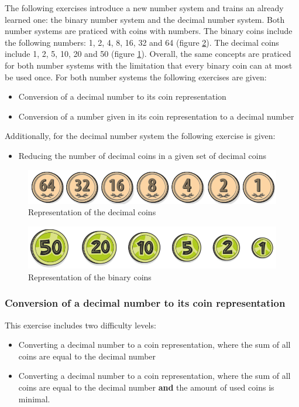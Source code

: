 The following exercises introduce a new number system and trains an already learned one: the binary number system and the decimal number system. Both number systems are praticed with coins with numbers. The binary coins include the following numbers: 1, 2, 4, 8, 16, 32 and 64 (figure \ref{fig:binary_coins}). The decimal coins include 1, 2, 5, 10, 20 and 50 (figure \ref{fig:decimal_coins}). 
Overall, the same concepts are praticed for both number systems with the limitation that every binary coin can at most be used once. For both number systems the following exercises are given:
\begin{itemize}
    \item Conversion of a decimal number to its coin representation
    \item Conversion of a number given in its coin representation to a decimal number
\end{itemize}
Additionally, for the decimal number system the following exercise is given:
\begin{itemize}
    \item Reducing the number of decimal coins in a given set of decimal coins
\end{itemize}

\begin{figure} 
    \centering
    \includegraphics[width=0.5 \columnwidth]{figures/decimal_coins.png}
    \caption{Representation of the decimal coins} 
    \label{fig:decimal_coins} 
\end{figure}

\begin{figure} 
    \centering
    \includegraphics[width=0.5 \columnwidth]{figures/binary_coins.png}
    \caption{Representation of the binary coins} 
    \label{fig:binary_coins} 
\end{figure}

\subsubsection*{Conversion of a decimal number to its coin representation}

This exercise includes two difficulty levels:
\begin{itemize}
    \item Converting a decimal number to a coin representation, where the sum of all coins are equal to the decimal number
    \item Converting a decimal number to a coin representation, where the sum of all coins are equal to the decimal number \textbf{and} the amount of used coins is minimal.
\end{itemize}

